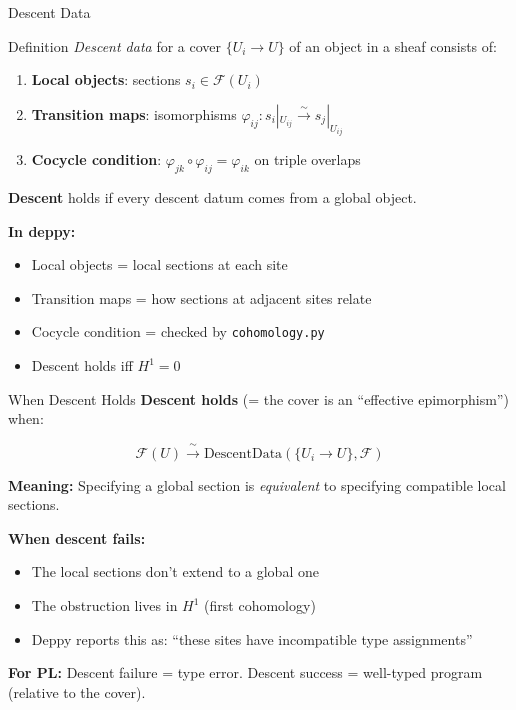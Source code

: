 \documentclass[aspectratio=169,10pt]{beamer}
\newcommand{\Fscr}{\mathcal{F}}
\begin{document}
\begin{frame}{Descent Data}
\begin{block}{Definition}
\emph{Descent data} for a cover $\{U_i \to U\}$ of an object in a sheaf consists of:
\begin{enumerate}
  \item \textbf{Local objects}: sections $s_i \in \Fscr(U_i)$
  \item \textbf{Transition maps}: isomorphisms $\varphi_{ij} : s_i|_{U_{ij}} \xrightarrow{\sim} s_j|_{U_{ij}}$
  \item \textbf{Cocycle condition}: $\varphi_{jk} \circ \varphi_{ij} = \varphi_{ik}$ on triple overlaps
\end{enumerate}
\end{block}

\textbf{Descent} holds if every descent datum comes from a global object.

\vspace{0.3em}
\textbf{In deppy:}
\begin{itemize}
  \item Local objects = local sections at each site
  \item Transition maps = how sections at adjacent sites relate
  \item Cocycle condition = checked by \texttt{cohomology.py}
  \item Descent holds iff $H^1 = 0$
\end{itemize}
\end{frame}

\begin{frame}{When Descent Holds}
\textbf{Descent holds} (= the cover is an ``effective epimorphism'') when:

\[
\Fscr(U) \xrightarrow{\;\sim\;} \text{DescentData}(\{U_i \to U\}, \Fscr)
\]

\textbf{Meaning:} Specifying a global section is \emph{equivalent} to specifying compatible local sections.

\vspace{0.5em}
\textbf{When descent fails:}
\begin{itemize}
  \item The local sections don't extend to a global one
  \item The obstruction lives in $H^1$ (first cohomology)
  \item Deppy reports this as: ``these sites have incompatible type assignments''
\end{itemize}

\vspace{0.3em}
\textbf{For PL:} Descent failure = type error. Descent success = well-typed program (relative to the cover).
\end{frame}
\end{document}
